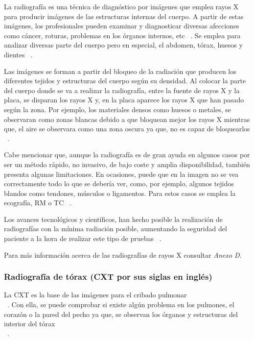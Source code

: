 La radiografía es una técnica de diagnóstico por imágenes que emplea rayos X para producir imágenes de las estructuras internas del cuerpo. A partir de estas imágenes, los profesionales pueden examinar y diagnosticar diversas afecciones como cáncer, roturas, problemas en los órganos internos, etc ~\cite{CliUniNa24}. Se emplea para analizar diversas parte del cuerpo pero en especial, el abdomen, tórax, huesos y dientes ~\cite{Macli24}.

Las imágenes se forman a partir del bloqueo de la radiación que producen los diferentes tejidos y estructuras del cuerpo según su densidad. Al colocar la parte del cuerpo donde se va a realizar la radiografía, entre la fuente de rayos X y la placa, se disparan los rayos X y, en la placa aparece los rayos X que han pasado según la zona. Por ejemplo, los materiales densos como huesos o metales, se observaran como zonas blancas debido a que bloquean mejor los rayos X mientras que, el aire se observara como una zona oscura ya que, no es capaz de bloquearlos ~\cite{CliUniNa24, Macli24}.

Cabe mencionar que, aunque la radiografía es de gran ayuda en algunos casos por ser un método rápido, no invasivo, de bajo coste y amplia disponibilidad, también presenta algunas limitaciones. En ocasiones, puede que en la imagen no se vea correctamente todo lo que se debería ver, como, por ejemplo, algunos tejidos blandos como tendones, músculos o ligamentos. Para estos casos se emplea la ecografía, RM o TC ~\cite{CliUniNa24}.

Los avances tecnológicos y científicos, han hecho posible la realización de radiografías con la mínima radiación posible, aumentando la seguridad del paciente a la hora de realizar este tipo de pruebas ~\cite{CliUniNa24}. 

Para más información acerca de las radiografías de rayos X consultar \textit{Anexo D}.


\subsubsection{Radiografía de tórax (CXT por sus siglas en inglés)}

La CXT es la base de las imágenes para el cribado pulmonar\\ ~\cite{gelaw15}. Con ella, se puede comprobar si existe algún problema en los pulmones, el corazón o la pared del pecho ya que, se observan los órganos y estructuras del interior del tórax\\ ~\cite{Macli24, NIH24}.

